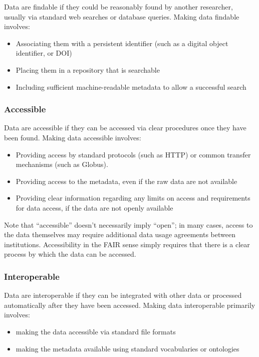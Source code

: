 Data are findable if they could be reasonably found by another researcher, usually via standard web searches or database queries.  Making data findable involves:

\begin{itemize}
\item Associating them with a persistent identifier (such as a digital object identifier, or DOI)
\item Placing them in a repository that is searchable
\item Including sufficient machine-readable metadata to allow a successful search
\end{itemize}

\subsubsection{Accessible}

Data are accessible if they can be accessed via clear procedures once they have been found. Making data accessible involves:

\begin{itemize}
\item Providing access by standard protocols (such as HTTP) or common transfer mechanisms (such as Globus).
\item Providing access to the metadata, even if the raw data are not available
\item Providing clear information regarding any limits on access and requirements for data access, if the data are not openly available
\end{itemize}

Note that ``accessible'' doesn't necessarily imply ``open''; in many cases, access to the data themselves may require additional data usage agreements between institutions.  Accessibility in the FAIR sense simply requires that there is a clear process by which the data can be accessed.

\subsubsection{Interoperable}

Data are interoperable if they can be integrated with other data or processed automatically after they have been accessed.  Making data interoperable primarily involves:

\begin{itemize}
\item making the data accessible via standard file formats
\item making the metadata available using standard vocabularies or ontologies
\end{itemize}

